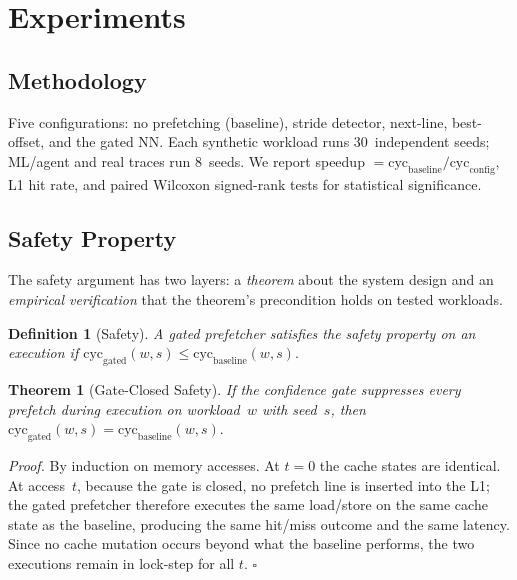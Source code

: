 \documentclass[conference]{IEEEtran}
\newtheorem{definition}{Definition}
\newtheorem{theorem}{Theorem}
\begin{document}
\section{Experiments}
\label{sec:experiments}

\subsection{Methodology}

Five configurations: no prefetching (baseline), stride detector, next-line, best-offset,
and the gated NN. Each synthetic workload runs 30~independent seeds; ML/agent and
real traces run 8~seeds. We report speedup $= \text{cyc}_\text{baseline} / \text{cyc}_\text{config}$,
L1 hit rate, and paired Wilcoxon signed-rank tests for statistical significance.

\subsection{Safety Property}
\label{sec:safety}

The safety argument has two layers: a \emph{theorem} about the system design and an
\emph{empirical verification} that the theorem's precondition holds on tested
workloads.

\begin{definition}[Safety]
\label{def:safety}
A gated prefetcher satisfies the safety property on an execution if
$\text{cyc}_{\text{gated}}(w, s) \leq \text{cyc}_{\text{baseline}}(w, s).$
\end{definition}

\begin{theorem}[Gate-Closed Safety]
\label{thm:safety}
If the confidence gate suppresses every prefetch during execution on workload~$w$
with seed~$s$, then
$\text{cyc}_{\text{gated}}(w, s) = \text{cyc}_{\text{baseline}}(w, s).$
\end{theorem}

\noindent\textit{Proof.}
By induction on memory accesses. At $t{=}0$ the cache states are identical.
At access~$t$, because the gate is closed, no prefetch line is inserted into the
L1; the gated prefetcher therefore executes the same load/store on the same cache
state as the baseline, producing the same hit/miss outcome and the same latency.
Since no cache mutation occurs beyond what the baseline performs, the two executions
remain in lock-step for all $t$. \hfill$\square$
\end{document}
